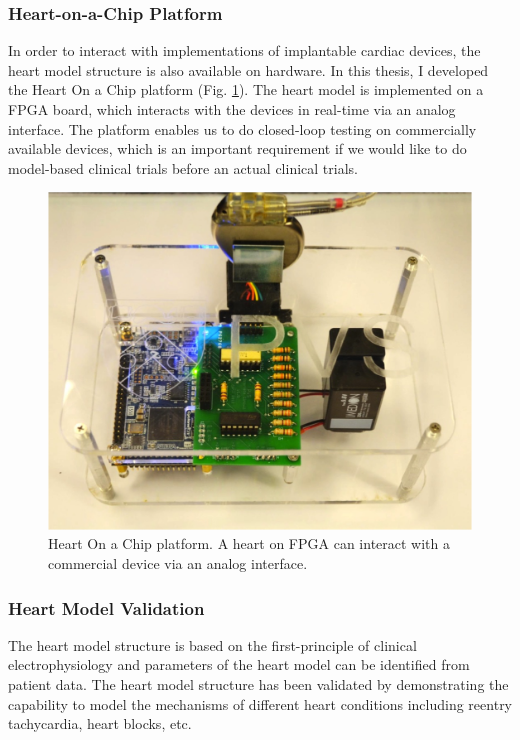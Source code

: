 \documentclass[a4paper,11pt]{article}
\begin{document}
\subsubsection{Heart-on-a-Chip Platform}
In order to interact with implementations of implantable cardiac devices, the heart model structure is also available on hardware. 
In this thesis, I developed the Heart On a Chip platform (Fig. \ref{fig:HOC}).
The heart model is implemented on a FPGA board, which interacts with the devices in real-time via an analog interface.
The platform enables us to do closed-loop testing on commercially available devices, which is an important requirement if we would like to do model-based clinical trials before an actual clinical trials.
\begin{figure}[t]
	\centering
	\includegraphics[scale=0.55]{figs/HOC.png}
	\caption{\small Heart On a Chip platform. A heart on FPGA can interact with a commercial device via an analog interface.}
	\label{fig:HOC}
\end{figure}
\subsubsection{Heart Model Validation}
The heart model structure is based on the first-principle of clinical electrophysiology and parameters of the heart model can be identified from patient data.
The heart model structure has been validated by demonstrating the capability to model the mechanisms of different heart conditions including reentry tachycardia, heart blocks, etc.
\end{document}
